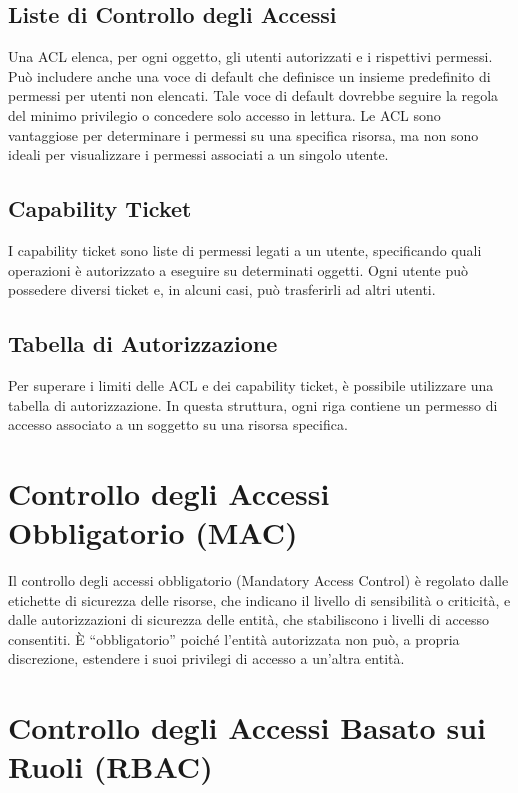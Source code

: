 \subsection{Liste di Controllo degli Accessi}

Una ACL elenca, per ogni oggetto, gli utenti autorizzati e i rispettivi permessi. Può includere anche una voce di default che definisce un insieme predefinito di permessi per utenti non elencati. Tale voce di default dovrebbe seguire la regola del minimo privilegio o concedere solo accesso in lettura. Le ACL sono vantaggiose per determinare i permessi su una specifica risorsa, ma non sono ideali per visualizzare i permessi associati a un singolo utente.

\subsection{Capability Ticket}

I capability ticket sono liste di permessi legati a un utente, specificando quali operazioni è autorizzato a eseguire su determinati oggetti. Ogni utente può possedere diversi ticket e, in alcuni casi, può trasferirli ad altri utenti.

\subsection{Tabella di Autorizzazione}

Per superare i limiti delle ACL e dei capability ticket, è possibile utilizzare una tabella di autorizzazione. In questa struttura, ogni riga contiene un permesso di accesso associato a un soggetto su una risorsa specifica.

\section{Controllo degli Accessi Obbligatorio (MAC)}

Il controllo degli accessi obbligatorio (Mandatory Access Control) è regolato dalle etichette di sicurezza delle risorse, che indicano il livello di sensibilità o criticità, e dalle autorizzazioni di sicurezza delle entità, che stabiliscono i livelli di accesso consentiti. È ``obbligatorio'' poiché l'entità autorizzata non può, a propria discrezione, estendere i suoi privilegi di accesso a un'altra entità.

\section{Controllo degli Accessi Basato sui Ruoli (RBAC)}

